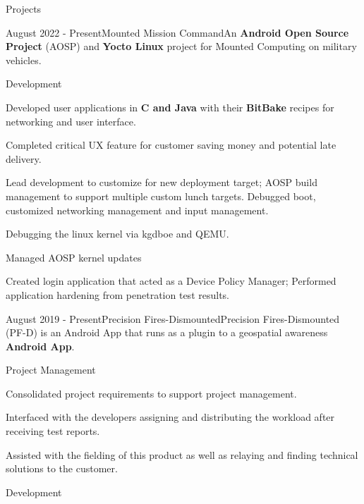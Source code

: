 \documentclass{article}
\newlength{\tabin}
\newlength{\secsep}
\newcommand{\lineunder}{\vspace*{-8pt} \\ \hspace*{-6pt} \hrulefill \\ \vspace*{-15pt}}
\newenvironment{tabbedsection}[1]{
	\begin{list}{}{
			\setlength{\itemsep}{0pt}
			\setlength{\labelsep}{0pt}
			\setlength{\labelwidth}{0pt}
			\setlength{\leftmargin}{0pt}
			\setlength{\rightmargin}{\tabin}
			\setlength{\listparindent}{0pt}
			\setlength{\parsep}{0pt}
			\setlength{\parskip}{0pt}
			\setlength{\partopsep}{0pt}
			\setlength{\topsep}{#1}
		}
		\item[]
	}{\end{list}}
\newenvironment{resume_section}[1]{
	\filbreak
	\vspace{2\secsep}
	\textsc{\color{blue}\large#1}
	\lineunder
	\begin{tabbedsection}{\secsep}
	}{\end{tabbedsection}}
\newenvironment{resume_project_subsection}[3]{
	\textbf{\color{BlueViolet}#2} \hfill \hspace{-5em} {\normalsize (#1)}
	\\ {\small \textit{ #3}}
	\begin{tabbedsection}{0.5\secsep}
		\begin{subitems}
		}{\end{subitems}\end{tabbedsection}}
\newenvironment{subitems}{
	\renewcommand{\labelitemi}{-}
	\begin{itemize}
		\setlength{\labelsep}{1em}
	}{\end{itemize}}
\newenvironment{resume_skill_group}[1]{
	\hspace{-18pt}\textbf{#1}
	\begin{itemize}
	}{\end{itemize}}
\begin{document}
\begin{resume_section}{Projects}
\begin{resume_project_subsection}{August 2022 - Present}{Mounted Mission Command}{An \textbf{Android Open Source Project} (AOSP) and \textbf{Yocto Linux} project for Mounted Computing on military vehicles.}
			\begin{resume_skill_group}{Development}
				\item 
				\item  
				Developed user applications in \textbf{C and Java} with their \textbf{BitBake} recipes for networking and user interface. 
				\item 
				Completed critical UX feature for customer saving money and potential late delivery.
				\item 
				Lead development to customize for new deployment target; AOSP build management to support multiple custom lunch targets. Debugged boot, customized networking management and input management.
				\item
				Debugging the linux kernel via kgdboe and QEMU.
				\item
				Managed AOSP kernel updates
				\item
				Created login application that acted as a Device Policy Manager; Performed application hardening from penetration test results.
			\end{resume_skill_group}
		\end{resume_project_subsection}
		\vspace{2\secsep}
		\begin{resume_project_subsection}{August 2019 - Present}{Precision Fires-Dismounted}{Precision Fires-Dismounted (PF-D) is an Android App that runs as a plugin to a geospatial awareness \textbf{Android App}.}			
			\begin{resume_skill_group}{Project Management}
				\item 
				\item 
					Consolidated project requirements to support project management. 
				\item 
					Interfaced with the developers assigning and distributing the workload after receiving test reports.
				\item 
					Assisted with the fielding of this product as well as relaying and finding technical solutions to the customer. 
				\end{resume_skill_group}
				
				\begin{resume_skill_group}{Development}
						\item 
				

\end{resume_skill_group}
\end{resume_project_subsection}
\end{resume_section}
\end{document}
